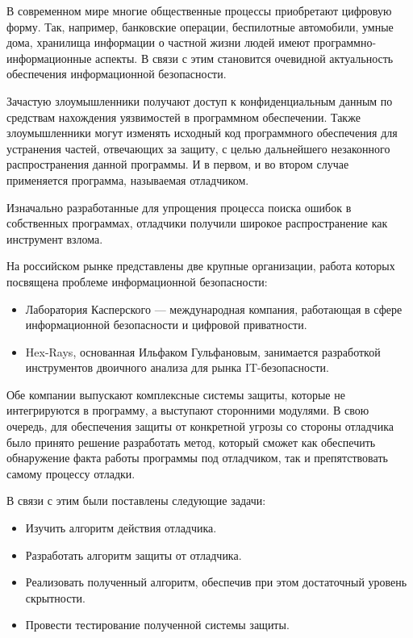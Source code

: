 
В современном мире многие  общественные процессы приобретают цифровую форму.
Так, например, банковские операции, беспилотные автомобили, умные дома,
хранилища информации о частной жизни людей имеют программно-информационные
аспекты. В связи с этим становится очевидной актуальность обеспечения
информационной безопасности. 

Зачастую злоумышленники получают доступ к конфиденциальным данным по средствам
нахождения уязвимостей в программном обеспечении. Также злоумышленники могут
изменять исходный код программного обеспечения для устранения частей, отвечающих
за защиту, с целью дальнейшего незаконного распространения данной программы. И в
первом, и во втором случае применяется программа, называемая отладчиком. 

Изначально разработанные для упрощения процесса поиска ошибок в собственных
программах, отладчики получили широкое распространение как инструмент взлома. 

На российском рынке представлены две крупные организации, работа которых
посвящена проблеме информационной безопасности:
\begin{itemize}
  \item Лаборатория Касперского --- международная компания, работающая в сфере
    информационной безопасности и цифровой приватности.
  \item Hex-Rays, основанная Ильфаком Гульфановым, занимается разработкой
    инструментов двоичного анализа для рынка IT-безопасности.
\end{itemize}

Обе компании выпускают комплексные системы защиты, которые не интегрируются в
программу, а выступают сторонними модулями. В свою очередь, для обеспечения
защиты от конкретной угрозы со стороны отладчика было принято решение
разработать метод, который сможет как обеспечить обнаружение факта работы
программы под отладчиком, так и препятствовать самому процессу отладки.


В связи с этим были поставлены следующие задачи:
\begin{itemize}
  \item Изучить алгоритм действия отладчика.
  \item Разработать алгоритм защиты от отладчика.
  \item Реализовать полученный алгоритм, обеспечив при этом достаточный
    уровень скрытности.
  \item Провести тестирование полученной системы защиты.
\end{itemize}
